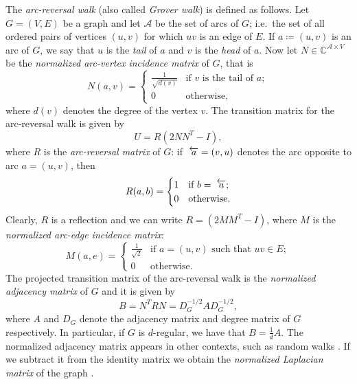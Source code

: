 \documentclass{article}
\numberwithin{equation}{section}
\newcommand\cx{{\mathbb C}}%
\newcommand\cA{{\mathcal A}}
\newcommand\revarc[1]{{\mkern5mu\overleftarrow{\mkern1mu#1}}}
\begin{document}
The \textsl{arc-reversal walk} (also called \textsl{Grover walk}) is defined as follows. Let $G = (V,E)$ be a graph and let $\cA$ be the set of arcs of $G$; i.e.\ the set of all ordered pairs of vertices $(u,v)$ for which $uv$ is an edge of $E$. If $a \coloneq (u,v)$ is an arc of $G$, we say that $u$ is the \textsl{tail} of $a$ and $v$ is the \textsl{head} of $a$. Now let $N \in \cx^{\cA \times V}$ be the \textsl{normalized arc-vertex incidence matrix} of $G$, that is
\[
N(a,v) = \begin{cases}
\frac{1}{\sqrt{d(v)}} &\text{if $v$ is the tail of $a$}; \\
0 &\text{otherwise,}
\end{cases}
\]
where $d(v)$ denotes the degree of the vertex $v$. The transition matrix for the arc-reversal walk is given by
\[
U = R(2NN^T - I),
\]
where $R$ is the \textsl{arc-reversal matrix} of $G$: if $\revarc{a} = (v,u)$ denotes the arc opposite to arc $a = (u,v)$, then
\[
R(a,b) = \begin{cases}
1 &\text{if $b = \revarc{a}$}; \\
0 &\text{otherwise.}
\end{cases}
\]
Clearly, $R$ is a reflection and we can write $R = (2MM^T - I)$, where $M$ is the \textsl{normalized arc-edge incidence matrix}:
\[
M(a,e) = \begin{cases}
\frac{1}{\sqrt{2}} &\text{if $a = (u,v)$ such that $uv \in E$};\\
0 &\text{otherwise.}
\end{cases}
\]
The projected transition matrix of the arc-reversal walk is the \textsl{normalized adjacency matrix} of $G$ and it is given by
\[
B = N^T R N = D_G^{-1/2} A D_G^{-1/2},
\]
where $A$ and $D_G$ denote the adjacency matrix and degree matrix of $G$ respectively.  In particular, if $G$ is $d$-regular, we have that $B = \frac{1}{d}A$. The normalized adjacency matrix appears in other contexts, such as random walks \cite{Spi2019}. If we subtract it from the identity matrix we obtain the \textsl{normalized Laplacian matrix} of the graph \cite{Chu1997}.
\end{document}
